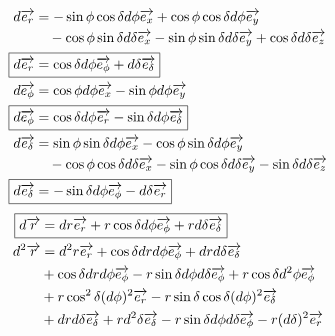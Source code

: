 \documentclass{report}
\begin{document}
\begin{align*}
d\overrightarrow{e_r}&=-\sin\phi\cos\delta d\phi\overrightarrow{e_x}+\cos\phi\cos\delta d\phi\overrightarrow{e_y}\\
&\quad-\cos\phi\sin\delta d\delta\overrightarrow{e_x}-\sin\phi\sin\delta d\delta\overrightarrow{e_y}+\cos\delta d\delta\overrightarrow{e_z}\\
\Aboxed{d\overrightarrow{e_r}&=\cos\delta d\phi\overrightarrow{e_\phi}+d\delta\overrightarrow{e_\delta}}\\
d\overrightarrow{e_\phi}&=\cos\phi d\phi\overrightarrow{e_x}-\sin\phi d\phi\overrightarrow{e_y}\\
\Aboxed{d\overrightarrow{e_\phi}&=\cos\delta d\phi\overrightarrow{e_r}-\sin\delta d\phi\overrightarrow{e_\delta}}\\
d\overrightarrow{e_\delta}&=\sin\phi\sin\delta d\phi\overrightarrow{e_x}-\cos\phi\sin\delta d\phi\overrightarrow{e_y}\\
&\quad-\cos\phi\cos\delta d\delta\overrightarrow{e_x}-\sin\phi\cos\delta d\delta\overrightarrow{e_y}-\sin\delta d\delta\overrightarrow{e_z}\\
\Aboxed{d\overrightarrow{e_\delta}&=-\sin\delta d\phi\overrightarrow{e_\phi}-d\delta\overrightarrow{e_r}}
\end{align*}
\begin{align*}
\Aboxed{d\overrightarrow{r}&=dr\overrightarrow{e_r}+r\cos\delta d\phi\overrightarrow{e_\phi}+rd\delta\overrightarrow{e_\delta}}\\
d^2\overrightarrow{r}&=d^2r\overrightarrow{e_r}+\cos\delta drd\phi\overrightarrow{e_\phi}+drd\delta\overrightarrow{e_\delta}\\
&+\cos\delta drd\phi\overrightarrow{e_\phi}-r\sin\delta d\phi d\delta\overrightarrow{e_\phi}+r\cos\delta d^2\phi\overrightarrow{e_\phi}\\
&+r\cos^2\delta(d\phi)^2\overrightarrow{e_r}-r\sin\delta\cos\delta(d\phi)^2\overrightarrow{e_\delta}\\
&+drd\delta\overrightarrow{e_\delta}+rd^2\delta\overrightarrow{e_\delta}-r\sin\delta d\phi d\delta\overrightarrow{e_\phi}-r(d\delta)^2\overrightarrow{e_r}
\end{align*}
\begin{center}\end{center}
\end{document}
